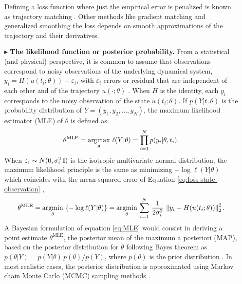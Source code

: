 \begin{itemize}
    Defining a loss function where just the empirical error is penalized is known as trajectory matching \cite{ramsay2017dynamic}. 
    Other methods like gradient matching and generalized smoothing the loss depends on smooth approximations of the trajectory and their derivatives. 
    \item[$ \blacktriangleright$] \textbf{The likelihood function or posterior probability.} From a statistical (and physical) perspective, it is common to assume that observations correspond to noisy observations of the underlying dynamical system, $y_i = H(u(t_i; \theta)) + \varepsilon_i$, with $\varepsilon_i$ errors or residual that are independent of each other and of the trajectory $u(\cdot ; \theta)$ \cite{ramsay2017dynamic}.
    When $H$ is the identity, each $y_i$ corresponds to the noisy observation of the state $u(t_i; \theta)$.
    If $p(Y | t , \theta)$ is the probability distribution of $Y=(y_1, y_2, \ldots, y_N)$, 
    the maximum likelihood estimator (MLE) of $\theta$ is defined as 
    \begin{equation}
        \theta^\text{MLE} 
        = 
        \underset{\theta}{\text{argmax}} \,\, \ell (Y | \theta) 
        = 
        \prod_{i=1}^N p(y_i | \theta, t_i) .
    \end{equation}
    When $\varepsilon_i \sim N(0, \sigma_i^2 \operatorname{\mathbb{I}})$ is the isotropic multivariate normal distribution, the maximum likelihood principle is the same as minimizing $- \log \ell(Y | \theta)$ which coincides with the mean squared error of Equation \eqref{eq:loss-state-observation} \cite{hastie2009elements},
    \begin{equation}
        \theta^\text{MLE} 
        = 
        \underset{\theta}{\text{argmin}} \, \left \{ - \log \ell (Y | \theta) \right \}
        = 
        \underset{\theta}{\text{argmin}} \, \sum_{i=1}^N 
        \, \frac{1}{2\sigma_i^2} \,
        \left \| y_i - H(u(t_i; \theta)) \right \|_2^2 .
        \label{eq:MLE}
    \end{equation}
    A Bayesian formulation of equation \eqref{eq:MLE} would consist in deriving a point estimate $\theta^\text{MLE}$, the posterior mean of the maximum a posteriori (MAP), based on the posterior distribution for $\theta$ following Bayes theorem as $p(\theta | Y) = {p(Y | \theta) \, p (\theta)}/{p(Y)}$, where $p(\theta)$ is the prior distribution \cite{pml1Book}.
    In most realistic cases, the posterior distribution is approximated using Markov chain Monte Carlo (MCMC) sampling methods \cite{gelman2013bayesian}. 

\end{itemize}

